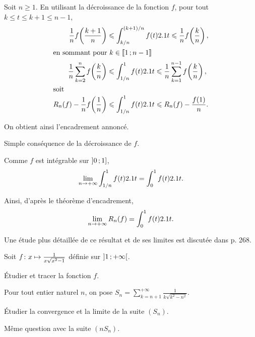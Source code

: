 \begin{elemsolution}
\begin{reponses}
\item Soit $n \geqslant 1$. En utilisant la décroissance de la fonction $f$, pour tout $k \leqslant t \leqslant k + 1 \leqslant n-1$,
\begin{align*}
\frac{1}{n} f\mathopen{}\left(\frac{k+1}{n}\right) &\leqslant \int_{k/n}^{(k+1)/n} f(t) \d t \leqslant \frac{1}{n} f\mathopen{}\left(\frac{k}{n}\right),\\
\intertext{en sommant pour $k \in \interent{1}{n-1}$}
\frac{1}{n} \sum\limits_{k=2}^{n} f\mathopen{}\left(\frac{k}{n}\right) &\leqslant \displaystyle\int_{1/n}^1 f(t) \d t \leqslant \frac{1}{n} \sum\limits_{k=1}^{n-1} f\mathopen{}\left(\frac{k}{n}\right),\\
\intertext{soit}
R_n(f) - \frac{1}{n} f\mathopen{}\left(\frac{1}{n}\right) &\leqslant \displaystyle\int_{1/n}^1 f(t) \d t \leqslant R_n(f) - \frac{f(1)}{n}.
\end{align*}

On obtient ainsi l'encadrement annoncé.

\item Simple conséquence de la décroissance de $f$.

\item Comme $f$ est intégrable sur $\interof{0}{1}$,
\[
\lim\limits_{n\to+\infty} \displaystyle\int_{1/n}^1 f(t) \d t = \displaystyle\int_0^1 f(t) \d t.
\]

\item Ainsi, d'après le théorème d'encadrement,
\[
\lim\limits_{n\to+\infty} R_n(f) = \displaystyle\int_0^1 f(t) \d t.
\]
\end{reponses}
\end{elemsolution}

\begin{remarque}
Une étude plus détaillée de ce résultat et de ses limites est discutée dans \cite{truc2019} p. 268.
\end{remarque}


\begin{exercice}
Soit $\fonctionligne[f]{x}{\frac{1}{x \sqrt{x^2 - 1}}}$ définie sur $\interoo{1}{+\infty}$.
\begin{questions}
\item Étudier et tracer la fonction $f$.
\end{questions}
Pour tout entier naturel $n$, on pose $S_n = \sum\limits_{k=n+1}^{+\infty} \frac{1}{k \sqrt{k^2 - n^2}}$.
\begin{questions}[resume]
\item Étudier la convergence et la limite de la suite $(S_n)$.

\item Même question avec la suite $(n S_n)$.
\end{questions}
\end{exercice}


